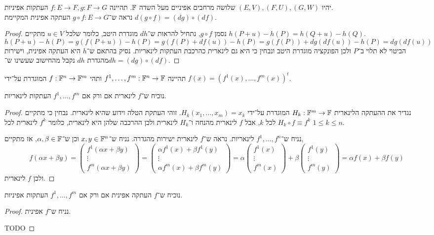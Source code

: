 \question{}
יהיו $(E, V), (F, U), (G, W)$ שלושה מרחבים אפיניים מעל השדה $\mathbb{F}$.
תהיינה $f : E \to F, g : F \to G$ העתקות אפיניות. \\
נראה ש־$g \circ f : E \to G$ העתקה אפינית המקיימת $d(g \circ f) = (dg) \circ (df)$.
\begin{proof}
	נסמן $g \circ f$, נתחיל להראות ש־$dh$ מוגדרת היטב, כלומר שלכל $u \in V$ מתקיים $h(P + u) - h(P) = h(Q + u) - h(Q)$.
	\[
		h(P + u) - h(P)
		= g(f(P + u)) - h(P)
		= g(f(P) + df(u)) - h(P)
		= g(f(P)) + dg(df(u)) - h(P)
		= dg(df(u)) 
	\]
	הביטוי לא תלוי ב־$P$ ולכן הפונקציה מוגדרת היטב ונבחין כי היא גם לינארית כהרכבת העתקות לינאריות.
	נסיק בהתאם ש־$h$ היא העתקה אפינית, וישירות מהגדרת $dh$ נקבל מהחישוב שעשינו ש־$dh = (dg) \circ (df)$.
\end{proof}

\question{}
תהיינה $f^1, \ldots, f^m : \mathbb{F}^n \to \mathbb{F}$ ותהי $f : \mathbb{F}^n \to \mathbb{F}^m$ המוגדרת על־ידי $f(x) = {(f^1(x), \ldots, f^m(x))}^t$.

\subquestion{}
נוכיח ש־$f$ לינארית אם ורק אם $f^1, \ldots, f^m$ העתקות לינאריות.
\begin{proof}
	נגדיר את ההעתקה הלינארית $H_k : \mathbb{F}^m \to \mathbb{F}$ המוגדרת על־ידי $H_k(x_1, \ldots, x_m) = x_k$.
	זוהי העתקת הטלה וידוע שהיא לינארית.
	נבחין כי מתקיים $H_k \circ f \equiv f^k$ לכל $k$, אבל $f$ לינארית מהנחה ו־$H_k$ לינארית ולכן ההרכבה שלהן היא לינארית, כלומר $f^k$ לינארית לכל $1 \le k \le n$.

	נניח ש־$f^1, \ldots, f^n$ לינאריות.
	נראה ש־$f$ לינארית ישירות מהגדרה.
	נניח ש־$x, y \in \mathbb{F}^n$ וכן ש־$\alpha, \beta \in \mathbb{F}$, אז מתקיים,
	\[
		f(\alpha x + \beta y)
		= \begin{pmatrix} f^1(\alpha x + \beta y) \\ \vdots \\ f^m(\alpha x + \beta y) \end{pmatrix} 
		= \begin{pmatrix} \alpha f^1(x) + \beta f^1(y) \\ \vdots \\ \alpha f^m(x) + \beta f^m(y) \end{pmatrix} 
		= \alpha \begin{pmatrix} f^1(x) \\ \vdots \\ f^m(x) \end{pmatrix} + \beta \begin{pmatrix} f^1(y) \\ \vdots \\ f^m(y) \end{pmatrix} 
		= \alpha f(x) + \beta f(y)
	\]
	ולכן $f$ לינארית.
\end{proof}

\subquestion{}
נוכיח ש־$f$ העתקה אפינית אם ורק אם $f^1, \ldots, f^m$ העתקות אפיניות.
\begin{proof}
	נניח ש־$f$ אפינית.
	
	TODO
\end{proof}


